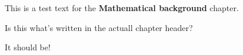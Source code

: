 This is a test text for the \textbf{Mathematical background} chapter.

Is this what's written in the actuall chapter header?

It should be!
